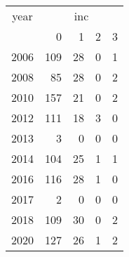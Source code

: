 \footnotesize\begin{tabular}[t]{lrrrr}
\toprule
\multicolumn{1}{c}{year} & \multicolumn{4}{c}{inc} \\
\cmidrule(l{3pt}r{3pt}){1-1} \cmidrule(l{3pt}r{3pt}){2-5}
  & 0 & 1 & 2 & 3\\
\midrule
2006 & 109 & 28 & 0 & 1\\
2008 & 85 & 28 & 0 & 2\\
2010 & 157 & 21 & 0 & 2\\
2012 & 111 & 18 & 3 & 0\\
2013 & 3 & 0 & 0 & 0\\
2014 & 104 & 25 & 1 & 1\\
2016 & 116 & 28 & 1 & 0\\
2017 & 2 & 0 & 0 & 0\\
2018 & 109 & 30 & 0 & 2\\
2020 & 127 & 26 & 1 & 2\\
\bottomrule
\end{tabular}
